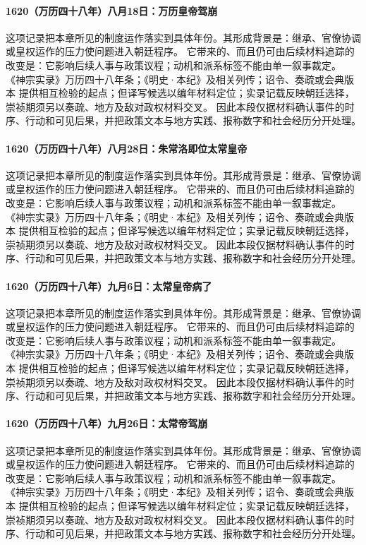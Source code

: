 \paragraph{1620（万历四十八年）八月18日：万历皇帝驾崩} 这项记录把本章所见的制度运作落实到具体年份。其形成背景是：继承、官僚协调或皇权运作的压力使问题进入朝廷程序。 它带来的、而且仍可由后续材料追踪的改变是：它影响后续人事与政策议程；动机和派系标签不能由单一叙事裁定。 《神宗实录》万历四十八年条；《明史·本纪》及相关列传；诏令、奏疏或会典版本 提供相互检验的起点；但译写候选以编年材料定位；实录记载反映朝廷选择，崇祯期须另以奏疏、地方及敌对政权材料交叉。 因此本段仅据材料确认事件的时序、行动和可见后果，并把政策文本与地方实践、报称数字和社会经历分开处理。

\paragraph{1620（万历四十八年）八月28日：朱常洛即位太常皇帝} 这项记录把本章所见的制度运作落实到具体年份。其形成背景是：继承、官僚协调或皇权运作的压力使问题进入朝廷程序。 它带来的、而且仍可由后续材料追踪的改变是：它影响后续人事与政策议程；动机和派系标签不能由单一叙事裁定。 《神宗实录》万历四十八年条；《明史·本纪》及相关列传；诏令、奏疏或会典版本 提供相互检验的起点；但译写候选以编年材料定位；实录记载反映朝廷选择，崇祯期须另以奏疏、地方及敌对政权材料交叉。 因此本段仅据材料确认事件的时序、行动和可见后果，并把政策文本与地方实践、报称数字和社会经历分开处理。

\paragraph{1620（万历四十八年）九月6日：太常皇帝病了} 这项记录把本章所见的制度运作落实到具体年份。其形成背景是：继承、官僚协调或皇权运作的压力使问题进入朝廷程序。 它带来的、而且仍可由后续材料追踪的改变是：它影响后续人事与政策议程；动机和派系标签不能由单一叙事裁定。 《神宗实录》万历四十八年条；《明史·本纪》及相关列传；诏令、奏疏或会典版本 提供相互检验的起点；但译写候选以编年材料定位；实录记载反映朝廷选择，崇祯期须另以奏疏、地方及敌对政权材料交叉。 因此本段仅据材料确认事件的时序、行动和可见后果，并把政策文本与地方实践、报称数字和社会经历分开处理。

\paragraph{1620（万历四十八年）九月26日：太常帝驾崩} 这项记录把本章所见的制度运作落实到具体年份。其形成背景是：继承、官僚协调或皇权运作的压力使问题进入朝廷程序。 它带来的、而且仍可由后续材料追踪的改变是：它影响后续人事与政策议程；动机和派系标签不能由单一叙事裁定。 《神宗实录》万历四十八年条；《明史·本纪》及相关列传；诏令、奏疏或会典版本 提供相互检验的起点；但译写候选以编年材料定位；实录记载反映朝廷选择，崇祯期须另以奏疏、地方及敌对政权材料交叉。 因此本段仅据材料确认事件的时序、行动和可见后果，并把政策文本与地方实践、报称数字和社会经历分开处理。

